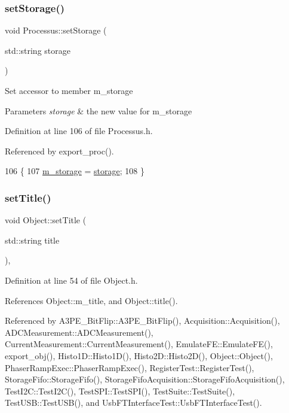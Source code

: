 \subsubsection{\texorpdfstring{set\+Storage()}{setStorage()}}
{\footnotesize\ttfamily void Processus\+::set\+Storage (\begin{DoxyParamCaption}\item[{std\+::string}]{storage }\end{DoxyParamCaption})\hspace{0.3cm}{\ttfamily [inline]}}

Set accessor to member m\+\_\+storage 
\begin{DoxyParams}{Parameters}
{\em storage} & the new value for m\+\_\+storage \\
\hline
\end{DoxyParams}


Definition at line 106 of file Processus.\+h.



Referenced by export\+\_\+proc().


\begin{DoxyCode}
106                                       \{
107     \hyperlink{classProcessus_a132b1e71f72327e5a87f0a168c7b6325}{m\_storage} = \hyperlink{classProcessus_a33fa1a0b54a636e5cdd680669fd9ea51}{storage};
108   \}
\end{DoxyCode}
\mbox{\label{classObject_a89557dbbad5bcaa02652f5d7fa35d20f}} 
\subsubsection{\texorpdfstring{set\+Title()}{setTitle()}}
{\footnotesize\ttfamily void Object\+::set\+Title (\begin{DoxyParamCaption}\item[{std\+::string}]{title }\end{DoxyParamCaption})\hspace{0.3cm}{\ttfamily [inline]}, {\ttfamily [inherited]}}



Definition at line 54 of file Object.\+h.



References Object\+::m\+\_\+title, and Object\+::title().



Referenced by A3\+P\+E\+\_\+\+Bit\+Flip\+::\+A3\+P\+E\+\_\+\+Bit\+Flip(), Acquisition\+::\+Acquisition(), A\+D\+C\+Measurement\+::\+A\+D\+C\+Measurement(), Current\+Measurement\+::\+Current\+Measurement(), Emulate\+F\+E\+::\+Emulate\+F\+E(), export\+\_\+obj(), Histo1\+D\+::\+Histo1\+D(), Histo2\+D\+::\+Histo2\+D(), Object\+::\+Object(), Phaser\+Ramp\+Exec\+::\+Phaser\+Ramp\+Exec(), Register\+Test\+::\+Register\+Test(), Storage\+Fifo\+::\+Storage\+Fifo(), Storage\+Fifo\+Acquisition\+::\+Storage\+Fifo\+Acquisition(), Test\+I2\+C\+::\+Test\+I2\+C(), Test\+S\+P\+I\+::\+Test\+S\+P\+I(), Test\+Suite\+::\+Test\+Suite(), Test\+U\+S\+B\+::\+Test\+U\+S\+B(), and Usb\+F\+T\+Interface\+Test\+::\+Usb\+F\+T\+Interface\+Test().


